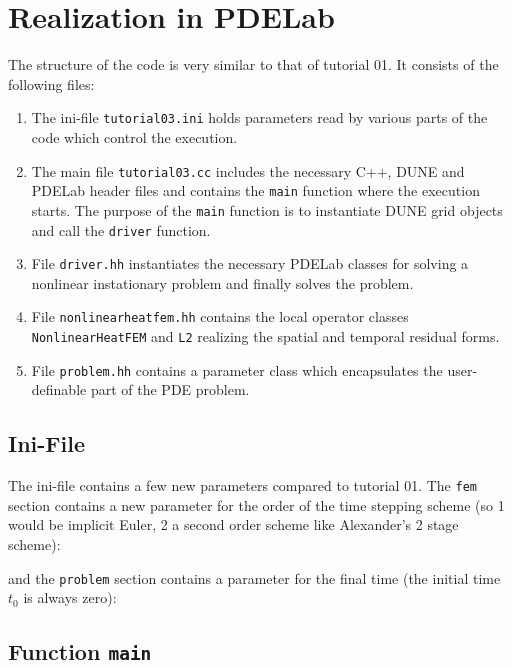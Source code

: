 \documentclass[a4paper,12pt]{article}
\begin{document}
\section{Realization in PDELab}

The structure of the code is very similar to that of tutorial 01.
It consists of the following files:
\begin{enumerate}[1)]
\item The ini-file
\lstinline{tutorial03.ini} holds parameters read by various parts of the code
which control the execution.
\item The main file \lstinline{tutorial03.cc} includes the necessary C++,
DUNE and PDELab header files
and contains the \lstinline{main} function where the execution starts.
The purpose of the \lstinline{main} function is
to instantiate DUNE grid objects and call the \lstinline{driver} function.
\item File \lstinline{driver.hh} instantiates the necessary PDELab classes
for solving a nonlinear instationary problem and finally solves the problem.
\item File \lstinline{nonlinearheatfem.hh} contains the local operator classes
\lstinline{NonlinearHeatFEM} and \lstinline{L2} realizing the spatial
and temporal residual forms.
\item File \lstinline{problem.hh} contains a parameter class which
encapsulates the user-definable part of the PDE problem.
\end{enumerate}

\subsection{Ini-File}

The ini-file contains a few new parameters compared to tutorial 01.
The \lstinline{fem} section contains a new parameter for the order of the
time stepping scheme (so 1 would be implicit Euler, 2 a second order
scheme like Alexander's 2 stage scheme):

and the \lstinline{problem} section contains a parameter for the final time (the
initial time $t_0$ is always zero):


\subsection{Function \lstinline{main}}
\end{document}
